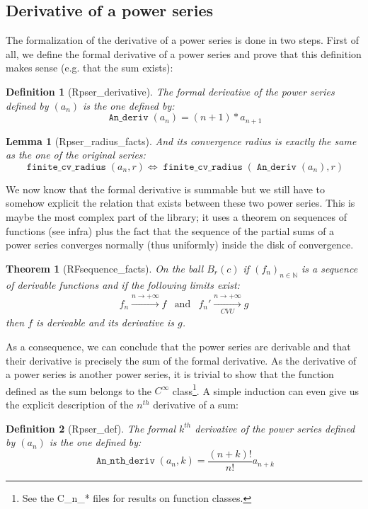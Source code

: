 \documentclass[submission,copyright]{eptcs}
\newcommand{\N}{\mathbb{N}}
\DeclareMathOperator{\D}{\mathtt{An\_deriv}}
\DeclareMathOperator{\Dn}{\mathtt{An\_nth\_deriv}}
\DeclareMathOperator{\fcvr}{\mathtt{finite\_cv\_radius}}
\newtheorem{definition}{Definition}
\newtheorem{lemma}{Lemma}
\newtheorem{theorem}{Theorem}
\begin{document}
\subsection{Derivative of a power series}

The formalization of the derivative of a power series is done in two steps.
First of all, we define the formal derivative of a power series and prove
that this definition makes sense (e.g. that the sum exists):

\begin{definition}[Rpser\_derivative] The formal derivative of the power
series defined by $(a_n)$ is the one defined by:
$$\D{}(a_n) = (n + 1) * a_{n+1}$$
\end{definition}

\begin{lemma}[Rpser\_radius\_facts] And its convergence radius is exactly
the same as the one of the original series: $$\fcvr{}(a_n,r) \Leftrightarrow
\fcvr{}(\D{}(a_n),r)$$\end{lemma}

We now know that the formal derivative is summable but we still have to
somehow explicit the relation that exists between these two power series.
This is maybe the most complex part of the library; it uses a theorem on
sequences of functions (see infra) plus the fact that the sequence of
the partial sums of a power series converges normally (thus uniformly)
inside the disk of convergence.

\begin{theorem}[RFsequence\_facts] On the ball $B_r(c)$ if
$(f_n)_{n \in \N}$ is a sequence of derivable functions and if the
following limits exist: $$ \begin{array}{ccc}
f_n \xrightarrow{n \to +\infty} f & \text{and} &
f_n' \xrightarrow[CVU]{n \to +\infty} g\end{array}$$ then $f$ is
derivable and its derivative is $g$.\end{theorem}

As a consequence, we can conclude that the power series are derivable
and that their derivative is precisely the sum of the formal derivative.
As the derivative of a power series is another power series, it is
trivial to show that the function defined as the sum belongs to the
$C^{\infty}$ class\footnote{See the C\_n\_* files for results on
function classes.}. A simple induction can even give us the explicit
description of the $n^{th}$ derivative of a sum:

\begin{definition}[Rpser\_def] The formal $k^{th}$ derivative of the power
series defined by $(a_n)$ is the one defined by:
$$\Dn{}(a_n,k)  = \frac{(n + k)!}{n!} a_{n+k}$$
\end{definition}
\end{document}
